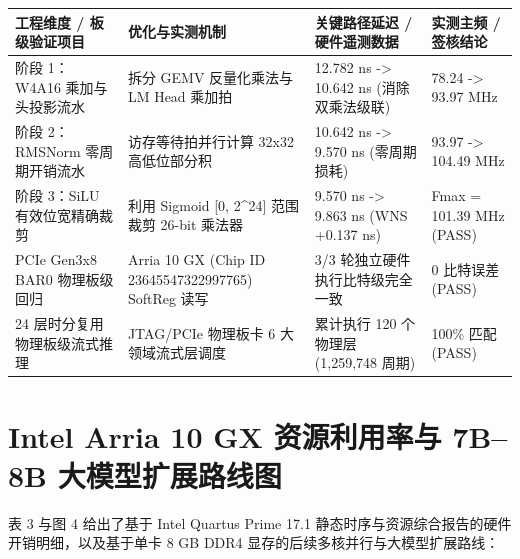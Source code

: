 \documentclass[11pt,a4paper]{article}
\begin{document}
{\footnotesize\renewcommand{\arraystretch}{1.14}\begin{longtable}{@{}L{0.23\textwidth}L{0.27\textwidth}L{0.24\textwidth}L{0.16\textwidth}@{}}\toprule

\textbf{工程维度 /\allowbreak{} 板级验证项目} & \textbf{优化与实测机制} & \textbf{关键路径延迟 /\allowbreak{} 硬件遥测数据} & \textbf{实测主频 /\allowbreak{} 签核结论}\\\midrule\endhead

阶段 1：W4A16 乘加与头投影流水 & 拆分 GEMV 反量化乘法与 LM Head 乘加拍 & 12.782 ns -> 10.642 ns (\allowbreak{}消除双乘法级联)\allowbreak{} & 78.24 -> 93.97 MHz\\[2pt]

阶段 2：RMSNorm 零周期开销流水 & 访存等待拍并行计算 32x32 高低位部分积 & 10.642 ns -> 9.570 ns (\allowbreak{}零周期损耗)\allowbreak{} & 93.97 -> 104.49 MHz\\[2pt]

阶段 3：SiLU 有效位宽精确裁剪 & 利用 Sigmoid [\allowbreak{}0,\allowbreak{} 2\textasciicircum{}24]\allowbreak{} 范围裁剪 26-bit 乘法器 & 9.570 ns -> 9.863 ns (\allowbreak{}WNS +\allowbreak{}0.137 ns)\allowbreak{} & Fmax =\allowbreak{} 101.39 MHz (\allowbreak{}PASS)\allowbreak{}\\[2pt]

PCIe Gen3x8 BAR0 物理板级回归 & Arria 10 GX (\allowbreak{}Chip ID 23645547\allowbreak{}32299776\allowbreak{}5)\allowbreak{} SoftReg 读写 & 3/\allowbreak{}3 轮独立硬件执行比特级完全一致 & 0 比特误差 (\allowbreak{}PASS)\allowbreak{}\\[2pt]

24 层时分复用物理板级流式推理 & JTAG/\allowbreak{}PCIe 物理板卡 6 大领域流式层调度 & 累计执行 120 个物理层 (\allowbreak{}1,\allowbreak{}259,\allowbreak{}748 周期)\allowbreak{} & 100\% 匹配 (\allowbreak{}PASS)\allowbreak{}\\[2pt]

\bottomrule\end{longtable}}

\section{Intel Arria 10 GX 资源利用率与 7B–8B 大模型扩展路线图}

表 3 与图 4 给出了基于 Intel Quartus Prime 17.1 静态时序与资源综合报告的硬件开销明细，以及基于单卡 8 GB DDR4 显存的后续多核并行与大模型扩展路线：
\end{document}
